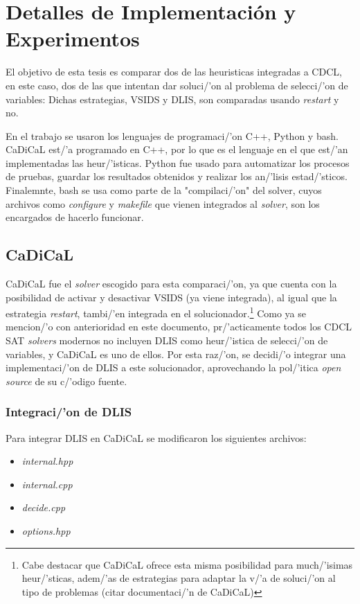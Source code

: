 \chapter{Detalles de Implementación y Experimentos}\label{chapter:implementation}
El objetivo de esta tesis es comparar dos de las heuristicas integradas a CDCL, en este caso, dos de las que intentan dar soluci/'on al problema de selecci/'on de variables: Dichas estrategias, VSIDS y DLIS, son comparadas usando \textit{restart} y no.

En el trabajo se usaron los lenguajes de programaci/'on C++, Python y bash. CaDiCaL est/'a programado en C++, por lo que es el lenguaje en el que est/'an implementadas las heur/'isticas. Python fue usado para automatizar los procesos de pruebas, guardar los resultados obtenidos y realizar los an/'lisis estad/'sticos. Finalemnte, bash se usa como parte de la "compilaci/'on" del solver, cuyos archivos como \textit{configure} y \textit{makefile} que vienen integrados al \textit{solver}, son los encargados de hacerlo funcionar.

\section{CaDiCaL}
CaDiCaL fue el \textit{solver} escogido para esta comparaci/'on, ya que cuenta con la posibilidad de activar y desactivar VSIDS (ya viene integrada), al igual que la estrategia \textit{restart}, tambi/'en integrada en el solucionador.\footnote{Cabe destacar que CaDiCaL ofrece esta misma posibilidad para much/'isimas heur/'sticas, adem/'as de estrategias para adaptar la v/'a de soluci/'on al tipo de problemas (citar documentaci/'n de CaDiCaL)} Como ya se mencion/'o con anterioridad en este documento, pr/'acticamente todos los CDCL SAT \textit{solvers} modernos no incluyen DLIS como heur/'istica de selecci/'on de variables, y CaDiCaL es uno de ellos. Por esta raz/'on, se decidi/'o integrar una implementaci/'on de DLIS a este solucionador, aprovechando la pol/'itica \textit{open source} de su c/'odigo fuente.%

\subsection{Integraci/'on de DLIS}
Para integrar DLIS en CaDiCaL se modificaron los siguientes archivos:
\begin{itemize}
    \item \textit{internal.hpp}
    \item \textit{internal.cpp}
    \item \textit{decide.cpp}
    \item \textit{options.hpp}
\end{itemize}

